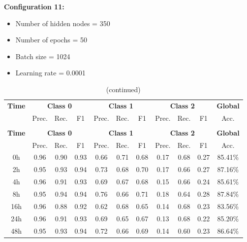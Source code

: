 \documentclass[12pt,oneside]{book} %
\begin{document}
\noindent \textbf{Configuration 11:}
\begin{multicols}{2}
    \begin{itemize}
        \item Number of hidden nodes = 350
        \item Number of epochs = 50
    \end{itemize}
    \begin{itemize}
         \item Batch size = 1024
         \item Learning rate = 0.0001
    \end{itemize}
\end{multicols}

\setlength\LTleft{1cm}
\begin{longtable}{ c ccc ccc ccc c}
\caption{Performance metrics of the LNN model for configuration 11} \\
\toprule
\textbf{Time} & \multicolumn{3}{c}{\textbf{Class 0}} & \multicolumn{3}{c}{\textbf{Class 1}} & \multicolumn{3}{c}{\textbf{Class 2}} & \textbf{Global} \\
               & Prec. & Rec. & F1  & Prec. & Rec. & F1   & Prec. & Rec. & F1  & Acc. \\
\midrule
\endfirsthead

\caption[]{(continued)} \\
\toprule
\textbf{Time} & \multicolumn{3}{c}{\textbf{Class 0}} & \multicolumn{3}{c}{\textbf{Class 1}} & \multicolumn{3}{c}{\textbf{Class 2}} & \textbf{Global} \\
               & Prec. & Rec. & F1  & Prec. & Rec. & F1   & Prec. & Rec. & F1  & Acc. \\
\midrule
\endhead

\bottomrule
\endfoot

\bottomrule
\endlastfoot

0h   & 0.96  & 0.90 & 0.93 & 0.66  & 0.71 & 0.68  & 0.17  & 0.68 & 0.27 & 85.41\% \\
2h   & 0.95  & 0.93 & 0.94 & 0.73  & 0.68 & 0.70  & 0.17  & 0.66 & 0.27 & 87.16\% \\
4h   & 0.96  & 0.91 & 0.93 & 0.69  & 0.67 & 0.68  & 0.15  & 0.66 & 0.24 & 85.61\% \\
8h   & 0.95  & 0.94 & 0.94 & 0.76  & 0.66 & 0.71  & 0.18  & 0.64 & 0.28 & 87.84\% \\
16h  & 0.96  & 0.88 & 0.92 & 0.62  & 0.68 & 0.65  & 0.14  & 0.68 & 0.23 & 83.56\% \\
24h  & 0.96  & 0.91 & 0.93 & 0.69  & 0.65 & 0.67  & 0.13  & 0.68 & 0.22 & 85.20\% \\
48h  & 0.95  & 0.93 & 0.94 & 0.72  & 0.66 & 0.69  & 0.14  & 0.60 & 0.23 & 86.64\% \\
\end{longtable}
\end{document}
